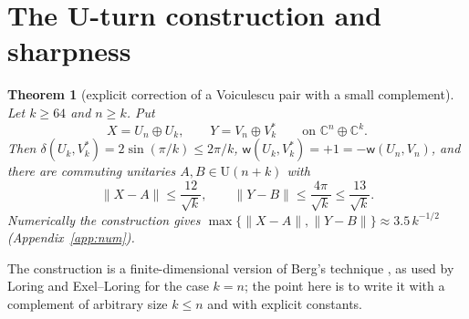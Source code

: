 \documentclass[11pt]{amsart}
\newtheorem{theorem}{Theorem}[section]
\theoremstyle{definition}
\theoremstyle{remark}
\newcommand{\C}{\mathbb C}
\newcommand{\wind}{\mathsf w}
\newcommand{\U}{\mathrm U}
\newcommand{\norm}[1]{\lVert #1\rVert}
\begin{document}
\section{The U-turn construction and sharpness}\label{sec:uturn}

\begin{theorem}[explicit correction of a Voiculescu pair with a small complement]\label{thm:uturn}
Let $k\ge64$ and $n\ge k$. Put
\[
X=U_n\oplus U_k,\qquad Y=V_n\oplus V_k^{*}\qquad\text{on }\C^{n}\oplus\C^{k}.
\]
Then $\delta(U_k,V_k^*)=2\sin(\pi/k)\le2\pi/k$, $\wind(U_k,V_k^*)=+1=-\wind(U_n,V_n)$, and there are commuting unitaries $A,B\in\U(n+k)$ with
\[
\norm{X-A}\le\frac{12}{\sqrt k},\qquad\norm{Y-B}\le\frac{4\pi}{\sqrt k}\le\frac{13}{\sqrt k}.
\]
Numerically the construction gives $\max\{\norm{X-A},\norm{Y-B}\}\approx3.5\,k^{-1/2}$ (Appendix~\ref{app:num}).
\end{theorem}

The construction is a finite-dimensional version of Berg's technique \cite{Berg71,Dav85}, as used by Loring \cite{Lor88} and Exel--Loring \cite{EL89} for the case $k=n$; the point here is to write it with a complement of arbitrary size $k\le n$ and with explicit constants.
\end{document}
